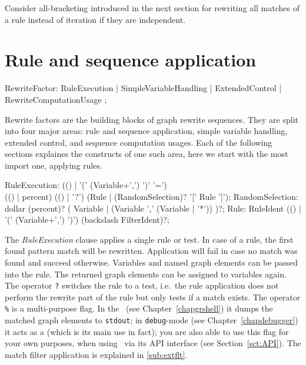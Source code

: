 \begin{note}
Consider all-bracketing introduced in the next section for rewriting all matches of a rule instead of iteration if they are independent.
\end{note}

\section{Rule and sequence application} \label{sec:ruleapplication}

\begin{rail} 
  RewriteFactor: RuleExecution
     | SimpleVariableHandling
     | ExtendedControl
     | RewriteComputationUsage
	; 
\end{rail}

Rewrite factors are the building blocks of graph rewrite sequences.
They are split into four major areas: rule and sequence application, simple variable handling, extended control, and sequence computation usages.
Each of the following sections explaines the constructs of one such area, here we start with the most import one, applying rules.

\begin{rail}    
  RuleExecution: (() | '(' (Variable+',') ')' '=') \\ (() | percent) (() | '?') (Rule | (RandomSelection)? '[' Rule ']');
  RandomSelection: dollar (percent)? ( Variable | (Variable ',' (Variable | '*')) )?;
  Rule: RuleIdent (() | '(' (Variable+',') ')') (backslash FilterIdent)?;
\end{rail}

The \emph{RuleExecution} clause applies a single rule or test.
In case of a rule, the first found pattern match will be rewritten.
Application will fail in case no match was found and succeed otherwise. 
Variables and named graph elements can be passed into the rule.
The returned graph elements can be assigned to variables again.
The operator \texttt{?} switches the rule to a test, i.e.\ the rule application does not perform the rewrite part of the rule but only tests if a match exists.
The operator \texttt{\%} is a multi-purpose flag. 
In the \GrShell\ (see Chapter~\ref{chapgrshell}) it dumps the matched graph elements to \texttt{stdout};
in \texttt{debug}-mode (see Chapter~\ref{chapdebugger}) it acts as a  (which is its main use in fact);
you are also able to use this flag for your own purposes, when using \GrG\ via its API interface (see Section~\ref{sct:API}).
The match filter application is explained in \ref{sub:extflt}.

